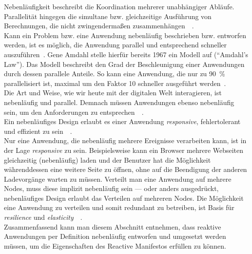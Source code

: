 Nebenläufigkeit beschreibt die Koordination mehrerer unabhängiger Abläufe. Parallelität hingegen die simultane bzw. gleichzeitige Ausführung von Berechnungen, die nicht zwingendermaßen zusammenhängen~\cite[S.~8-9]{pike_concurrency_2012}~\cite[S.~3]{butcher_seven_2014}.\\
Kann ein Problem bzw. eine Anwendung nebenläufig beschrieben bzw. entworfen werden, ist es möglich, die Anwendung parallel und entsprechend schneller auszuführen~\cite[S.~19~\&~S.~30]{pike_concurrency_2012}. Gene Amdahl stelle hierfür bereits 1967 ein Modell auf (\enquote{Amdahl's Law}). Das Modell beschreibt den Grad der Beschleunigung einer Anwendungen durch dessen parallele Anteile. So kann eine Anwendung, die nur zu 90~\% parallelisiert ist, maximal um den Faktor 10 schneller ausgeführt werden~\cite{amdahl_validity_1967}.\\

Die Art und Weise, wie wir heute mit der digitalen Welt interagieren, ist nebenläufig und parallel. Demnach müssen Anwendungen ebenso nebenläufig sein, um den Anforderungen zu entsprechen~\cite[S.~5]{butcher_seven_2014}~\cite[S.~3]{armstrong_programming_2013}.\\
Ein nebenläufiges Design erlaubt es einer Anwendung \textit{responsive}, fehlertolerant und effizient zu sein~\cite[S.~4~\&~S.~6]{butcher_seven_2014}~\cite[S.~6]{armstrong_programming_2013}.\\
Nur eine Anwendung, die nebenläufig mehrere Ereignisse verarbeiten kann, ist in der Lage \textit{responsive} zu sein. Beispielsweise kann ein Browser mehrere Webseiten gleichzeitig (nebenläufig) laden und der Benutzer hat die Möglichkeit währenddessen eine weitere Seite zu öffnen, ohne auf die Beendigung der anderen Ladevorgänge warten zu müssen. Verteilt man eine Anwendung auf mehrere Nodes, muss diese implizit nebenläufig sein --- oder anders ausgedrückt, nebenläufiges Design erlaubt das Verteilen auf mehreren Nodes. Die Möglichkeit eine Anwendung zu verteilen und somit redundant zu betreiben, ist Basis für \textit{resilience} und \textit{elasticity}~\cite[S.~6]{butcher_seven_2014}~\cite[S.~6~\&~S.~7]{armstrong_programming_2013}.\\

Zusammenfassend kann man diesem Abschnitt entnehmen, dass reaktive Anwendungen per Definition nebenläufig entworfen und umgesetzt werden müssen, um die Eigenschaften des Reactive Manifestos erfüllen zu können.

\pagebreak

